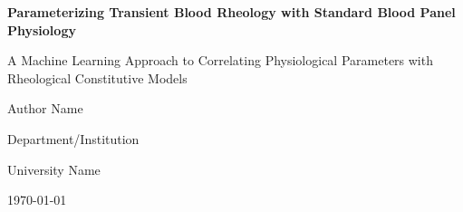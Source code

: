 \documentclass[12pt,letterpaper]{article}
\begin{document}
\begin{titlepage}
    \centering
    \vspace*{2cm}
    
    {\LARGE\bfseries Parameterizing Transient Blood Rheology with Standard Blood Panel Physiology\par}
    
    \vspace{1.5cm}
    
    {\large A Machine Learning Approach to Correlating Physiological Parameters with Rheological Constitutive Models\par}
    
    \vspace{2cm}
    
    {\Large Author Name\par}
    \vspace{0.5cm}
    {\large Department/Institution\par}
    {\large University Name\par}
    
    \vspace{2cm}
    
    {\large \today\par}
    
    \vfill
    
    \begin{abstract}
    \noindent This project aims to correlate routine physiological blood test data with a time-dependent (transient) constitutive model of blood rheology. Blood rheology models describe flow and deformation under different forces and timescales, essential for simulating circulation, cardiovascular disease diagnosis, and medical device design. The goal is to express human blood's transient constitutive model parameters as functions of measurable blood panel values using machine learning approaches. The tensorial-Enhanced Structural Stress Thixotropic Viscoelastic (t-ESSTV) model parameters will be predicted from standard physiological metrics including hematocrit, cholesterol, plasma protein concentration, and other routine blood panel measurements.
    \end{abstract}
    
\end{titlepage}

\newpage
\tableofcontents
\newpage

\end{document}
